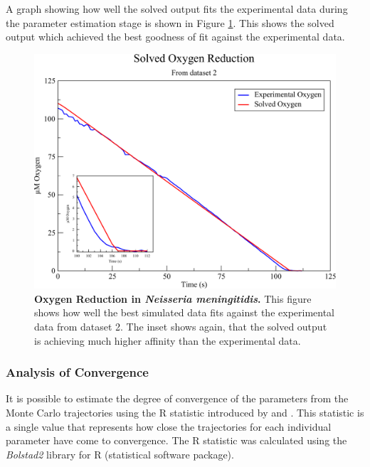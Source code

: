 A graph showing how well the solved output fits the experimental data during the parameter estimation stage is shown in Figure \ref{fig:oxyfinalsolved}. This shows the solved output which achieved the best goodness of fit against the experimental data.
\begin{figure}[tbp]
 \centering
 \includegraphics[width=14cm]{./05-oxygenreduction/data/final_solved.pdf}
 \caption[{Oxygen Reduction in \textit{Neisseria meningitidis}.}]{{\bf Oxygen Reduction in \textit{Neisseria meningitidis}.} This figure shows how well the best simulated data fits against the experimental data from dataset 2. The inset shows again, that the solved output is achieving much higher affinity than the experimental data.
 \label{fig:oxyfinalsolved}}
\end{figure}
\afterpage{\clearpage}

\subsubsection{Analysis of Convergence}
It is possible to estimate the degree of convergence of the parameters from the Monte Carlo trajectories using the R statistic introduced by \citet{Gelman1992} and \citet{Brooks1998}. This statistic is a single value that represents how close the trajectories for each individual parameter have come to convergence. The R statistic was calculated using the \textit{Bolstad2}\cite{Curran2011} library for R\cite{RDevelopmentCoreTeam2010} (statistical software package).

